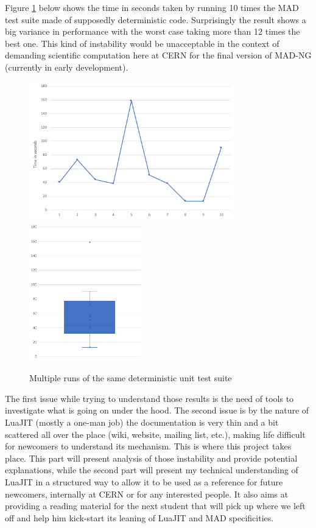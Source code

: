 
Figure \ref{fig:pb-statement} below shows the time in seconds taken by running 10
times the MAD test suite made of supposedly deterministic code. Surprisingly the
result shows a big variance in performance with the worst case taking more than
12 times the best one. This kind of instability would be unacceptable in the
context of demanding scientific computation here at CERN for the final version
of MAD-NG (currently in early development).

\begin{figure}[H]
    \centering
	\includegraphics[height=6cm]{./Images/pb-statement-curve.pdf}
	\includegraphics[height=6cm]{./Images/pb-statement-box.pdf}
    \caption{Multiple runs of the same deterministic unit test suite}
    \label{fig:pb-statement}
\end{figure}

The first issue while trying to understand those results is the need of tools
to investigate what is going on under the hood. The second issue is by the
nature of LuaJIT (mostly a one-man job) the documentation is very thin and a bit
scattered all over the place (wiki, website, mailing list, etc.), making life
difficult for newcomers to understand its mechanism.
This is where this project takes place. This part will present analysis of those
instability and provide potential explanations, while the second part
will present my technical understanding of LuaJIT in a structured way to allow
it to be used as a reference for future newcomers, internally at CERN or for any
interested people. It also aims at providing a reading material for the next
student that will pick up where we left off and help him kick-start its leaning
of LuaJIT and MAD specificities.
